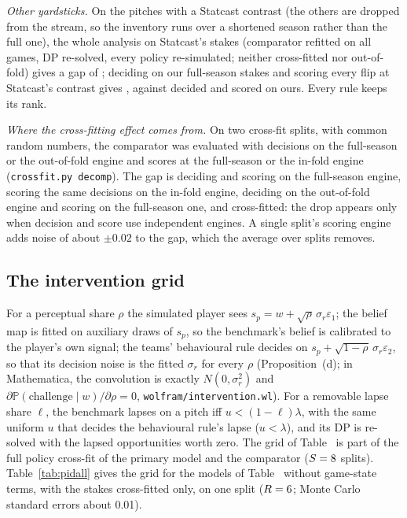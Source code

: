 \documentclass[aoas]{imsart}
\theoremstyle{plain}
\theoremstyle{definition}
\newcommand{\Prob}{\mathbb{P}}
\begin{document}
\emph{Other yardsticks.} On the pitches with a Statcast contrast (the others are dropped from the stream, so the
inventory runs over a shortened season rather than the full one), the whole analysis on Statcast's stakes (comparator refitted on all
games, DP re-solved, every policy re-simulated; neither cross-fitted nor out-of-fold) gives a gap of \SVLostSC; deciding on our full-season stakes and
scoring every flip at Statcast's contrast gives \SVLostOursSC, against \SVLostOursSame{} decided and scored on ours.
Every rule keeps its rank.

\emph{Where the cross-fitting effect comes from.} On two cross-fit splits, with common random numbers, the comparator
was evaluated with decisions on the full-season or the out-of-fold engine and scores at the full-season or the in-fold
engine (\texttt{crossfit.py decomp}). The gap is \XDFullFull{} deciding and scoring on the full-season engine,
\XDFullIn{} scoring the same decisions on the in-fold engine, \XDOutFull{} deciding on the out-of-fold engine and
scoring on the full-season one, and \XDOutIn{} cross-fitted: the drop appears only when decision and score use
independent engines. A single split's scoring engine adds noise of about $\pm0.02$ to the gap, which the average over
\XFitS{} splits removes.

\subsection{The intervention grid}\label{sec:pidfull}
For a perceptual share $\rho$ the simulated player sees $s_p=w+\sqrt\rho\,\sigma_r\varepsilon_1$; the belief map is
fitted on auxiliary draws of $s_p$, so the benchmark's belief is calibrated to the player's own signal; the teams'
behavioural rule decides on $s_p+\sqrt{1-\rho}\,\sigma_r\varepsilon_2$, so that its decision noise is the fitted
$\sigma_r$ for every $\rho$ (Proposition~(d); in Mathematica, the convolution is exactly
$N(0,\sigma_r^2)$ and $\partial\Prob(\text{challenge}\mid w)/\partial\rho=0$, \texttt{wolfram/intervention.wl}). For a
removable lapse share $\ell$, the benchmark lapses on a pitch iff $u<(1-\ell)\lambda$, with the same uniform $u$ that
decides the behavioural rule's lapse ($u<\lambda$), and its DP is re-solved with the lapsed opportunities worth zero.
The grid of Table~ is part of the full policy cross-fit of the primary model and the comparator
($S=8$ splits). Table~\ref{tab:pidall} gives the grid for the models of Table~ without game-state terms, with
the stakes cross-fitted only, on one split ($R=6$; Monte Carlo standard errors about 0.01).
\end{document}
